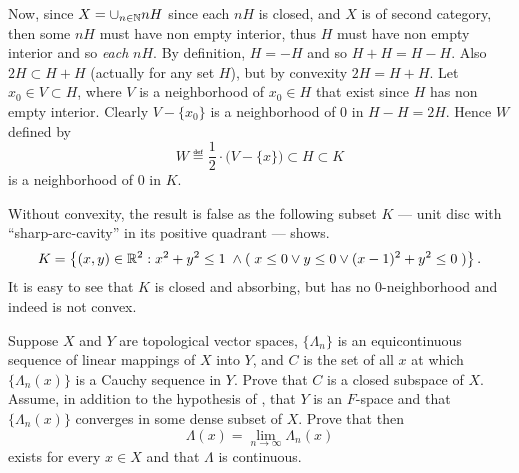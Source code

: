 \begin{enumerate}
Now, since \(X = \cup_{n\in\mathbb{N}} nH\)
since each \(nH\) is closed, and $X$ is of second category, then
some \(nH\) must have non empty interior, thus
$H$ must have non empty interior and so \emph{each} \(nH\).
 By definition, \(H= -H\)
and so \(H + H = H - H\). 
Also \(2H \subset H+H\) (actually for any set $H$), 
but by convexity \(2H = H+H\).
Let \(x_0\in V \subset H\), where $V$ is a neighborhood of \(x_0\in H\)
that exist since $H$ has non empty interior. Clearly 
\(V-\{x_0\}\) is a neighborhood of $0$ in \(H-H = 2H\).
Hence $W$ defined by 
\begin{equation*}
W \eqdef \frac{1}{2}\cdot\bigl(V-\{x\}\bigr) \subset H \subset K
\end{equation*}
is a neighborhood of $0$ in $K$.

Without convexity, the result is false as the following 
subset $K$ --- unit disc with ``sharp-arc-cavity'' in its positive quadrant ---
shows.
\begin{equation*}
K = \left\{(x,y)\in\mathbb{R}^2: x^2+y^2\leq 1 \; \wedge 
      (\; x\leq 0 \vee y\leq 0 \vee (x-1)^2+y^2 \leq 0\;)
      \right\}.
\end{equation*}
It is easy to see that $K$ is closed and absorbing, but has no $0$-neighborhood
and indeed is not convex.

\begin{excopy}
\begin{itemize}
  Suppose $X$ and $Y$ are topological vector spaces,
  \(\{\Lambda_n\}\) is an equicontinuous sequence of linear mappings
  of $X$ into $Y$, and $C$ is the set of all $x$ at which 
  \(\{\Lambda_n(x)\}\) is a Cauchy sequence in $Y$.
  Prove that $C$ is a closed subspace of $X$.
  Assume, in addition to the hypothesis of , that $Y$ is an $F$-space
  and that \(\{\Lambda_n(x)\}\) converges in some dense subset of $X$.
  Prove that then
  \begin{equation*}
    \Lambda(x) = \lim_{n\to \infty} \Lambda_n(x)
  \end{equation*}
  exists for every \(x\in X\) and that \(\Lambda\) is continuous.
\end{itemize}
\end{excopy}


\end{enumerate}
